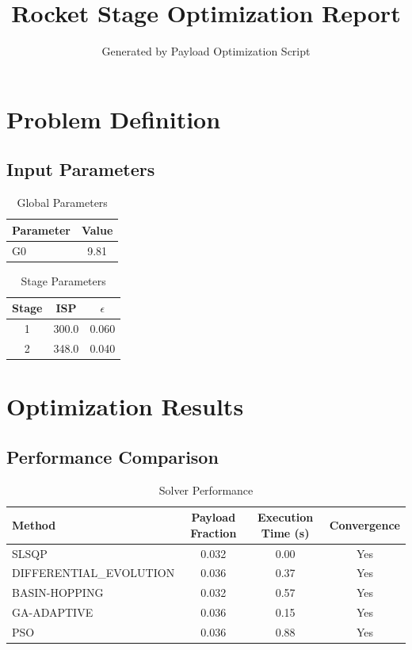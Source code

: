 \documentclass{article}
\begin{document}
\title{Rocket Stage Optimization Report}
\author{Generated by Payload Optimization Script}
\maketitle

\section{Problem Definition}
\subsection{Input Parameters}
\begin{table}[H]
\centering
\caption{Global Parameters}
\begin{tabular}{lc}
\toprule
Parameter & Value \\
\midrule
G0 & 9.81 \\
\bottomrule
\end{tabular}
\end{table}

\begin{table}[H]
\centering
\caption{Stage Parameters}
\begin{tabular}{ccc}
\toprule
Stage & ISP & $\epsilon$ \\
\midrule
1 & 300.0 & 0.060 \\
2 & 348.0 & 0.040 \\
\bottomrule
\end{tabular}
\end{table}

\section{Optimization Results}
\subsection{Performance Comparison}
\begin{table}[H]
\centering
\caption{Solver Performance}
\begin{tabular}{lccc}
\toprule
Method & Payload Fraction & Execution Time (s) & Convergence \\
\midrule
SLSQP & 0.032 & 0.00 & Yes \\
DIFFERENTIAL_EVOLUTION & 0.036 & 0.37 & Yes \\
BASIN-HOPPING & 0.032 & 0.57 & Yes \\
GA-ADAPTIVE & 0.036 & 0.15 & Yes \\
PSO & 0.036 & 0.88 & Yes \\
\bottomrule
\end{tabular}
\end{table}
\end{document}
